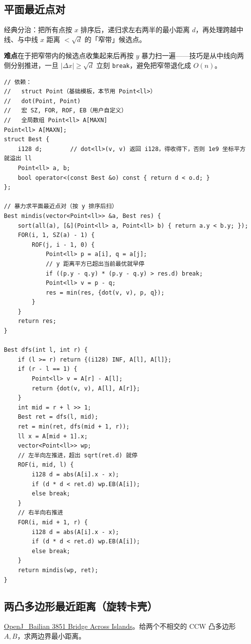 		\subsection{平面最近点对}

		经典分治：把所有点按 $x$ 排序后，递归求左右两半的最小距离 $d$，再处理跨越中线、与中线 $x$ 距离 $< \sqrt{d}$ 的「窄带」候选点。

		\textbf{难点}在于把窄带内的候选点收集起来后再按 $y$ 暴力扫一遍——技巧是从中线向两侧分别推进，一旦 $|\Delta x| \ge \sqrt{d}$ 立刻 \texttt{break}，避免把窄带退化成 $O(n)$。

		\begin{verbatim}
// 依赖：
//   struct Point（基础模板，本节用 Point<ll>）
//   dot(Point, Point)
//   宏 SZ, FOR, ROF, EB（用户自定义）
//   全局数组 Point<ll> A[MAXN]
Point<ll> A[MAXN];
struct Best {
	i128 d;        // dot<ll>(v, v) 返回 i128，得收得下，否则 1e9 坐标平方就溢出 ll
	Point<ll> a, b;
	bool operator<(const Best &o) const { return d < o.d; }
};

// 暴力求平面最近点对（按 y 排序后扫）
Best mindis(vector<Point<ll>> &a, Best res) {
	sort(all(a), [&](Point<ll> a, Point<ll> b) { return a.y < b.y; });
	FOR(i, 1, SZ(a) - 1) {
		ROF(j, i - 1, 0) {
			Point<ll> p = a[i], q = a[j];
			// y 距离平方已超出当前最优就早停
			if ((p.y - q.y) * (p.y - q.y) > res.d) break;
			Point<ll> v = p - q;
			res = min(res, {dot(v, v), p, q});
		}
	}
	return res;
}

Best dfs(int l, int r) {
	if (l >= r) return {(i128) INF, A[l], A[l]};
	if (r - l == 1) {
		Point<ll> v = A[r] - A[l];
		return {dot(v, v), A[l], A[r]};
	}
	int mid = r + l >> 1;
	Best ret = dfs(l, mid);
	ret = min(ret, dfs(mid + 1, r));
	ll x = A[mid + 1].x;
	vector<Point<ll>> wp;
	// 左半向左推进，超出 sqrt(ret.d) 就停
	ROF(i, mid, l) {
		i128 d = abs(A[i].x - x);
		if (d * d < ret.d) wp.EB(A[i]);
		else break;
	}
	// 右半向右推进
	FOR(i, mid + 1, r) {
		i128 d = abs(A[i].x - x);
		if (d * d < ret.d) wp.EB(A[i]);
		else break;
	}
	return mindis(wp, ret);
}
		\end{verbatim}

		\subsection{两凸多边形最近距离（旋转卡壳）}

		\href{https://vjudge.net/problem/OpenJ_Bailian-3851}{OpenJ\_Bailian 3851 Bridge Across Islands}。给两个不相交的 CCW 凸多边形 $A, B$，求两边界最小距离。

